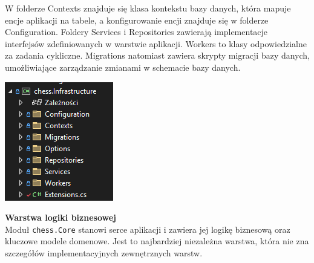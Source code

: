 \documentclass[twoside]{projektInzynierskiMS1}
\begin{document}
\vspace{0.5cm}
\noindent
\begin{minipage}[t]{0.5\textwidth}
    \vspace{0pt}
    \justifying 
    \noindent
    W folderze Contexts znajduje się klasa kontekstu bazy danych, która mapuje encje aplikacji na tabele, a konfigurowanie encji znajduje się w folderze Configuration. Foldery Services i Repositories zawierają implementacje interfejsów zdefiniowanych w warstwie aplikacji. Workers to klasy odpowiedzialne za zadania cykliczne. Migrations natomiast zawiera skrypty migracji bazy danych, umożliwiające zarządzanie zmianami w schemacie bazy danych.
\end{minipage}
\hfill
\begin{minipage}[t]{0.4\textwidth}
    \vspace{0pt}
    \centering
    \includegraphics[width=\linewidth]{images/struktura_back_infrastructure.png} 
\end{minipage}
\vspace{0.5cm}

\noindent \textbf{Warstwa logiki biznesowej}\\
Moduł \texttt{chess.Core} stanowi serce aplikacji i zawiera jej logikę biznesową oraz kluczowe modele domenowe. Jest to najbardziej niezależna warstwa, która nie zna szczegółów implementacyjnych zewnętrznych warstw.
\end{document}
